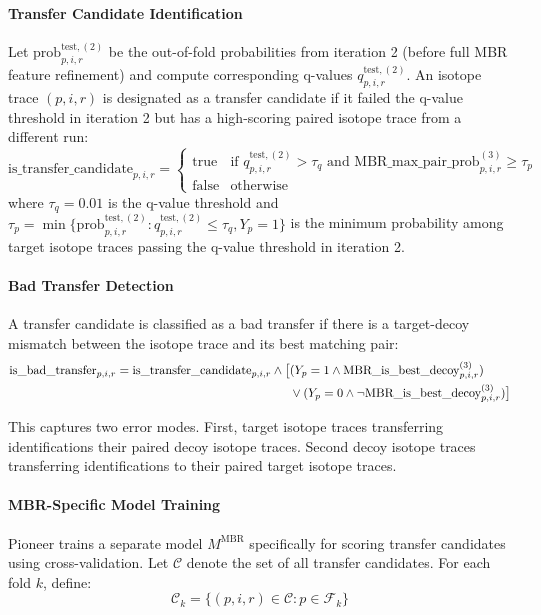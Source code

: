 \documentclass[pdflatex,sn-nature]{sn-jnl}
\begin{document}
\paragraph{Transfer Candidate Identification}\label{para:transfer-candidate-identification} Let $\text{prob}_{p,i,r}^{\text{test},(2)}$ be the out-of-fold probabilities from iteration 2 (before full MBR feature refinement) and compute corresponding q-values $q_{p,i,r}^{\text{test},(2)}$. An isotope trace $(p,i,r)$ is designated as a transfer candidate if it failed the q-value threshold in iteration 2 but has a high-scoring paired isotope trace from a different run:
\begin{equation}
  \text{is\_transfer\_candidate}_{p,i,r} = \begin{cases}
      \text{true} & \text{if } q_{p,i,r}^{\text{test},(2)} > \tau_q \text{ and } \text{MBR\_max\_pair\_prob}_{p,i,r}^{(3)} \geq \tau_p \\
      \text{false} & \text{otherwise}
  \end{cases}
\end{equation}
where $\tau_q = 0.01$ is the q-value threshold and $\tau_p = \min\{\text{prob}_{p,i,r}^{\text{test},(2)} : q_{p,i,r}^{\text{test},(2)} \leq \tau_q, Y_p = 1\}$ is the minimum probability among target isotope traces passing the q-value threshold in iteration 2.

\paragraph{Bad Transfer Detection}\label{para:bad-transfer-detection} A transfer candidate is classified as a bad transfer if there is a target-decoy mismatch between the isotope trace and its best matching pair:
\begin{align}
  \text{is\_bad\_transfer}_{p,i,r} = \text{is\_transfer\_candidate}_{p,i,r} \land \big[&(Y_p = 1 \land \text{MBR\_is\_best\_decoy}_{p,i,r}^{(3)}) \notag \\
  &\lor (Y_p = 0 \land \lnot\text{MBR\_is\_best\_decoy}_{p,i,r}^{(3)})\big]
\end{align}

This captures two error modes. First, target isotope traces transferring identifications their paired decoy isotope traces. Second decoy isotope traces transferring identifications to their paired target isotope traces.

\paragraph{MBR-Specific Model Training}\label{para:mbr-specific-model-training} Pioneer trains a separate model $M^{\text{MBR}}$ specifically for scoring transfer candidates using cross-validation. Let $\mathcal{C}$ denote the set of all transfer candidates. For each fold $k$, define:
\begin{equation}
  \mathcal{C}_k = \{(p,i,r) \in \mathcal{C} : p \in \mathcal{F}_k\}
\end{equation}
\end{document}
